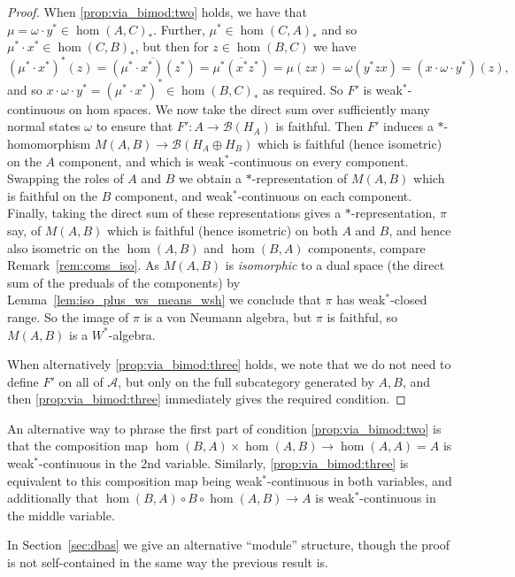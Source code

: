 \documentclass[a4paper,11pt]{article}
\theoremstyle{plain}
\theoremstyle{remark}
\newenvironment{remark}
  {\pushQED{\qed}\renewcommand{\qedsymbol}{$\triangle$}\remarkx}
  {\popQED\endremarkx}
\newcommand{\mc}[1]{\mathcal{#1}}
\begin{document}
\begin{proof}
When \ref{prop:via_bimod:two} holds, we have that $\mu = \omega\cdot y^* \in \hom(A,C)_*$.  Further, $\mu^* \in \hom(C,A)_*$ and so $\mu^* \cdot x^* \in \hom(C,B)_*$, but then for $z\in\hom(B,C)$ we have
\[ (\mu^*\cdot x^*)^*(z)
= \overline{ (\mu^*\cdot x^*)(z^*) }
= \overline{ \mu^*(x^*z^*) }
= \mu(zx)
= \omega(y^*zx)
= (x\cdot\omega\cdot y^*)(z), \]
and so $x\cdot\omega\cdot y^* = (\mu^*\cdot x^*)^* \in \hom(B,C)_*$ as required.  So $F'$ is weak$^*$-continuous on hom spaces.  We now take the direct sum over sufficiently many normal states $\omega$ to ensure that $F' \colon A \to \mc B(H_A)$ is faithful.  Then $F'$ induces a $*$-homomorphism $M(A,B) \to \mc B(H_A \oplus H_B)$ which is faithful (hence isometric) on the $A$ component, and which is weak$^*$-continuous on every component.  Swapping the roles of $A$ and $B$ we obtain a $*$-representation of $M(A,B)$ which is faithful on the $B$ component, and weak$^*$-continuous on each component.  Finally, taking the direct sum of these representations gives a $*$-representation, $\pi$ say, of $M(A,B)$  which is faithful (hence isometric) on both $A$ and $B$, and hence also isometric on the $\hom(A,B)$ and $\hom(B,A)$ components, compare Remark~\ref{rem:coms_iso}.  As $M(A,B)$ is \emph{isomorphic} to a dual space (the direct sum of the preduals of the components) by Lemma~\ref{lem:iso_plus_ws_means_wsh} we conclude that $\pi$ has weak$^*$-closed range.  So the image of $\pi$ is a von Neumann algebra, but $\pi$ is faithful, so $M(A,B)$ is a $W^*$-algebra.

When alternatively \ref{prop:via_bimod:three} holds, we note that we do not need to define $F'$ on all of $\mc A$, but only on the full subcategory generated by $A,B$, and then \ref{prop:via_bimod:three} immediately gives the required condition.
\end{proof}

\begin{remark}\label{rem:alt_bimod_conditions}
An alternative way to phrase the first part of condition \ref{prop:via_bimod:two} is that the composition map $\hom(B,A) \times \hom(A,B) \to \hom(A,A)=A$ is weak$^*$-continuous in the 2nd variable.  Similarly, \ref{prop:via_bimod:three} is equivalent to this composition map being weak$^*$-continuous in both variables, and additionally that $\hom(B,A) \circ B \circ \hom(A,B) \to A$ is weak$^*$-continuous in the middle variable.

In Section~\ref{sec:dbas} we give an alternative ``module'' structure, though the proof is not self-contained in the same way the previous result is.
\end{remark}
\end{document}
